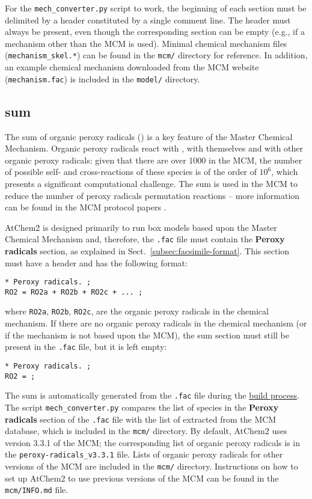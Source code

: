 For the \texttt{mech\_converter.py} script to work, the beginning of
each section must be delimited by a header constituted by a single
comment line. The header must always be present, even though the
corresponding section can be empty (e.g., if a mechanism other than
the MCM is used). Minimal chemical mechanism files
(\texttt{mechanism\_skel.*}) can be found in the \texttt{mcm/}
directory for reference. In addition, an example chemical mechanism
downloaded from the MCM website (\texttt{mechanism.fac}) is included
in the \texttt{model/} directory.

\subsection{ sum} \label{subsec:ro2-sum}

The sum of organic peroxy radicals () is a key feature of the
Master Chemical Mechanism. Organic peroxy radicals react with
, with themselves and with other organic peroxy radicals:
given that there are over 1000  in the MCM, the number of
possible self- and cross-reactions of these species is of the order of
$10^6$, which presents a significant computational challenge. The
 sum is used in the MCM to reduce the number of peroxy
radicals permutation reactions -- more information can be found in the
MCM protocol papers \citep{jenkin_1997, saunders_2003}.

AtChem2 is designed primarily to run box models based upon the Master
Chemical Mechanism and, therefore, the \texttt{.fac} file must contain
the \textbf{Peroxy radicals} section, as explained in
Sect.~\ref{subsec:facsimile-format}. This section must have a header
and has the following format:

\begin{verbatim}
* Peroxy radicals. ;
RO2 = RO2a + RO2b + RO2c + ... ;
\end{verbatim}

where \texttt{RO2a}, \texttt{RO2b}, \texttt{RO2c}, are the organic
peroxy radicals in the chemical mechanism. If there are no organic
peroxy radicals in the chemical mechanism (or if the mechanism is not
based upon the MCM), the  sum section must still be present in
the \texttt{.fac} file, but it is left empty:

\begin{verbatim}
* Peroxy radicals. ;
RO2 = ;
\end{verbatim}

The  sum is automatically generated from the \texttt{.fac}
file during the \hyperref[subsec:build-process]{build process}. The
script \texttt{mech\_converter.py} compares the list of species in the
\textbf{Peroxy radicals} section of the \texttt{.fac} file with the
list of  extracted from the MCM database, which is included in
the \texttt{mcm/} directory. By default, AtChem2 uses version 3.3.1 of
the MCM; the corresponding list of organic peroxy radicals is in the
\texttt{peroxy-radicals\_v3.3.1} file. Lists of organic peroxy
radicals for other versions of the MCM are included in the
\texttt{mcm/} directory. Instructions on how to set up AtChem2 to use
previous versions of the MCM can be found in the \texttt{mcm/INFO.md}
file.

